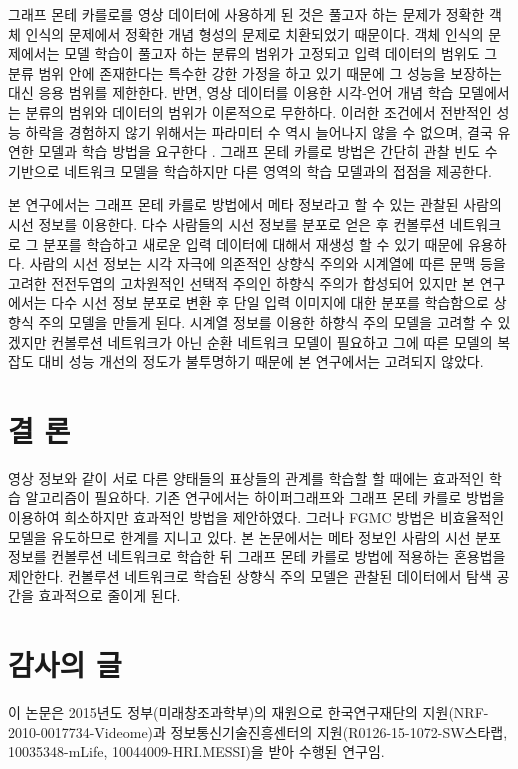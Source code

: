 \documentclass{kcc}
\begin{document}
그래프 몬테 카를로를 영상 데이터에 사용하게 된 것은 풀고자 하는 문제가 정확한 객체 인식의 문제에서 정확한 개념 형성의 문제로 치환되었기 때문이다. 객체 인식의 문제에서는 모델 학습이 풀고자 하는 분류의 범위가 고정되고 입력 데이터의 범위도 그 분류 범위 안에 존재한다는 특수한 강한 가정을 하고 있기 때문에 그 성능을 보장하는 대신 응용 범위를 제한한다. 반면, 영상 데이터를 이용한 시각-언어 개념 학습 모델에서는 분류의 범위와 데이터의 범위가 이론적으로 무한하다. 이러한 조건에서 전반적인 성능 하락을 경험하지 않기 위해서는 파라미터 수 역시 늘어나지 않을 수 없으며, 결국 유연한 모델과 학습 방법을 요구한다 \cite{zhang1994incremental}. 그래프 몬테 카를로 방법은 간단히 관찰 빈도 수 기반으로 네트워크 모델을 학습하지만 다른 영역의 학습 모델과의 접점을 제공한다.

본 연구에서는 그래프 몬테 카를로 방법에서 메타 정보라고 할 수 있는 관찰된 사람의 시선 정보를 이용한다. 다수 사람들의 시선 정보를 분포로 얻은 후 컨볼루션 네트워크로 그 분포를 학습하고 새로운 입력 데이터에 대해서 재생성 할 수 있기 때문에 유용하다. 사람의 시선 정보는 시각 자극에 의존적인 상향식 주의와 시계열에 따른 문맥 등을 고려한 전전두엽의 고차원적인 선택적 주의인 하향식 주의가 합성되어 있지만 본 연구에서는 다수 시선 정보 분포로 변환 후 단일 입력 이미지에 대한 분포를 학습함으로 상향식 주의 모델을 만들게 된다. 시계열 정보를 이용한 하향식 주의 모델을 고려할 수 있겠지만 컨볼루션 네트워크가 아닌 순환 네트워크 모델이 필요하고 그에 따른 모델의 복잡도 대비 성능 개선의 정도가 불투명하기 때문에 본 연구에서는 고려되지 않았다.

\section{결 론}

영상 정보와 같이 서로 다른 양태들의 표상들의 관계를 학습할 할 때에는 효과적인 학습 알고리즘이 필요하다. 기존 연구에서는 하이퍼그래프와 그래프 몬테 카를로 방법을 이용하여 희소하지만 효과적인 방법을 제안하였다. 그러나 FGMC 방법은 비효율적인 모델을 유도하므로 한계를 지니고 있다. 본 논문에서는 메타 정보인 사람의 시선 분포 정보를 컨볼루션 네트워크로 학습한 뒤 그래프 몬테 카를로 방법에 적용하는 혼용법을 제안한다. 컨볼루션 네트워크로 학습된 상향식 주의 모델은 관찰된 데이터에서 탐색 공간을 효과적으로 줄이게 된다. 

\section{감사의 글}
이 논문은 2015년도 정부(미래창조과학부)의 재원으로 한국연구재단의 지원(NRF-2010-0017734-Videome)과 정보통신기술진흥센터의 지원(R0126-15-1072-SW스타랩, 10035348-mLife, 10044009-HRI.MESSI)을 받아 수행된 연구임.



\end{document}
